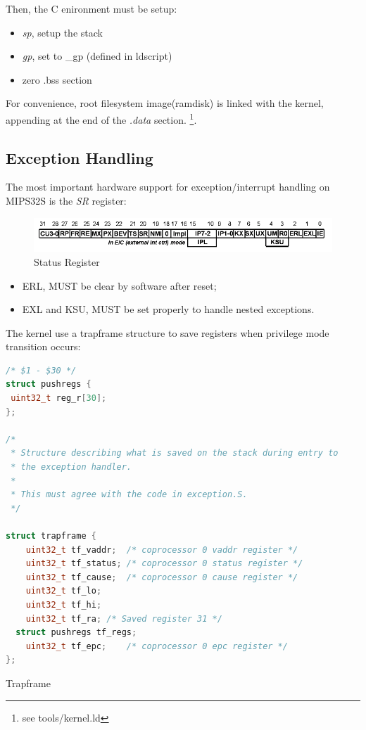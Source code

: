 \documentclass[a4paper]{article}
\begin{document}
Then, the C enironment must be setup:
\begin{itemize}
\item \emph{sp}, setup the stack
\item \emph{gp}, set to \_gp (defined in ldscript)
\item zero .bss section
\end{itemize}

For convenience, root filesystem image(ramdisk) is linked
with the kernel, appending at the end of the \emph{.data} section.
\footnote{see tools/kernel.ld}.

\subsection{Exception Handling}
The most important hardware support for exception/interrupt handling on MIPS32S is the \emph{SR}
register:

\begin{figure}[h]
\centering
\includegraphics[width=0.8\linewidth]{reg-sr.png}
\caption{Status Register\cite{Sweetman:2006:SMR:1210986}}
\label{fig:reg-sr}
\end{figure}

\begin{itemize}
\item ERL, MUST be clear by software after reset;
\item EXL and KSU, MUST be set properly to handle nested exceptions.
\end{itemize}

The kernel use a trapframe structure to save registers when privilege mode transition occurs:
\begin{algorithm}[h]
   \begin{lstlisting}[language={C++}]
/* $1 - $30 */
struct pushregs {
 uint32_t reg_r[30];
};

/*
 * Structure describing what is saved on the stack during entry to
 * the exception handler.
 *
 * This must agree with the code in exception.S.
 */

struct trapframe {
	uint32_t tf_vaddr;	/* coprocessor 0 vaddr register */
	uint32_t tf_status;	/* coprocessor 0 status register */
	uint32_t tf_cause;	/* coprocessor 0 cause register */
	uint32_t tf_lo;
	uint32_t tf_hi;
	uint32_t tf_ra;	/* Saved register 31 */
  struct pushregs tf_regs;
	uint32_t tf_epc;	/* coprocessor 0 epc register */
};

\end{lstlisting}
\caption{Trapframe}
\end{algorithm}
\end{document}
